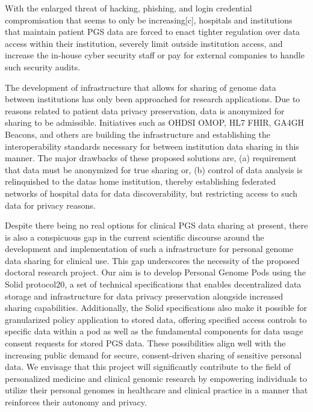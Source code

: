 \documentclass{article}
\begin{document}
With the enlarged threat of hacking, phishing, and login credential compromisation that seems to only be increasing[c], hospitals and institutions that maintain patient PGS data are forced to enact tighter regulation over data access within their institution, severely limit outside institution access, and increase the in-house cyber security staff or pay for external companies to handle such security audits.  

The development of infrastructure that allows for sharing of genome data between institutions has only been approached for research applications. Due to reasons related to patient data privacy preservation, data is anonymized for sharing to be admissible. Initiatives such as OHDSI OMOP, HL7 FHIR, GA4GH Beacons, and others are building the infrastructure and establishing the interoperability standards necessary for between institution data sharing in this manner. The major drawbacks of these proposed solutions are, (a) requirement that data must be anonymized for true sharing or, (b) control of data analysis is relinquished to the data\textquotesingle s home institution, thereby establishing federated networks of hospital data for data discoverability, but restricting access to such data for privacy reasons.

Despite there being no real options for clinical PGS data sharing at present, there is also a conspicuous gap in the current scientific discourse around the development and implementation of such a infrastructure for personal genome data sharing for clinical use. This gap underscores the necessity of the proposed doctoral research project. Our aim is to develop Personal Genome Pods using the Solid protocol20, a set of technical specifications that enables decentralized data storage and infrastructure for data privacy preservation alongside increased sharing capabilities. Additionally, the Solid specifications also make it possible for granularized policy application to stored data, offering specified access controls to specific data within a pod as well as the fundamental components for data usage consent requests for stored PGS data. These possibilities align well with the increasing public demand for secure, consent-driven sharing of sensitive personal data. We envisage that this project will significantly contribute to the field of personalized medicine and clinical genomic research by empowering individuals to utilize their personal genomes in healthcare and clinical practice in a manner that reinforces their autonomy and privacy.
\end{document}
